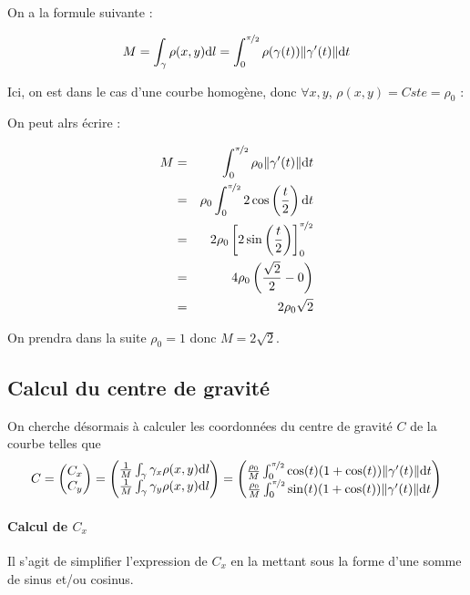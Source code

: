 \documentclass[a4paper, 11pt]{report} %
\newcommand{\dt}{\mathrm{d}t}
\newcommand{\dl}{\mathrm{d}l}
\begin{document}
On a la formule suivante :

\[
    M = \int_\gamma\rho(x,y)\dl = \int_0^{\nicefrac{\pi}{2}}\rho(\gamma(t))\lVert\gamma'(t)\rVert\dt
\]


Ici, on est dans le cas d'une courbe homogène, donc $\forall x,y$, $\rho(x,y)=Cste=\rho_0$ :

On peut alrs écrire :

\begin{eqnarray*}
    M & = & \int_0^{\nicefrac{\pi}{2}}\rho_0\lVert\gamma'(t)\rVert\dt\\
      & = & \rho_0\int_0^{\nicefrac{\pi}{2}}2\cos\left(\frac{t}{2}\right)\dt\\
      & = & 2\rho_0\left[2\sin\left(\frac{t}{2}\right)\right]_0^{\nicefrac{\pi}{2}}\\
      & = & 4\rho_0\left(\frac{\sqrt{2}}{2}-0\right)\\
      & = & 2\rho_0\sqrt{2}
\end{eqnarray*}

On prendra dans la suite $\rho_0 = 1$ donc $M = 2\sqrt{2}$.

\subsection{Calcul du centre de gravité} %

On cherche désormais à calculer les coordonnées du centre de gravité $C$ de la courbe telles que
\[C = \begin{pmatrix}C_x\\C_y\end{pmatrix} = 
        \begin{pmatrix}
            \frac{1}{M}\int_\gamma\gamma_x\rho(x,y)\dl\\
            \frac{1}{M}\int_\gamma\gamma_y\rho(x,y)\dl
        \end{pmatrix} = 
        \begin{pmatrix}
            \frac{\rho_0}{M}\int_0^{\nicefrac{\pi}{2}}\cos(t)(1+\cos(t))\lVert\gamma'(t)\rVert\dt\\
            \frac{\rho_0}{M}\int_0^{\nicefrac{\pi}{2}}\sin(t)(1+\cos(t))\lVert\gamma'(t)\rVert\dt
        \end{pmatrix}
\]

\paragraph{Calcul de $C_x$} %
Il s'agit de simplifier l'expression de $C_x$ en la mettant sous la forme d'une somme de sinus et/ou cosinus.
\end{document}
